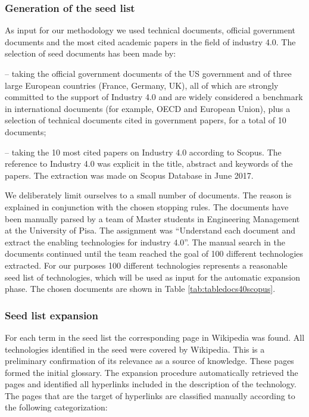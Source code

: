 \documentclass[]{book}
\theoremstyle{definition}
\theoremstyle{definition}
\theoremstyle{definition}
\theoremstyle{remark}
\begin{document}
\subsubsection*{Generation of the seed
list}\label{generation-of-the-seed-list}

As input for our methodology we used technical documents, official
government documents and the most cited academic papers in the field of
industry 4.0. The selection of seed documents has been made by:

-- taking the official government documents of the US government and of
three large European countries (France, Germany, UK), all of which are
strongly committed to the support of Industry 4.0 and are widely
considered a benchmark in international documents (for example, OECD and
European Union), plus a selection of technical documents cited in
government papers, for a total of 10 documents;

-- taking the 10 most cited papers on Industry 4.0 according to Scopus.
The reference to Industry 4.0 was explicit in the title, abstract and
keywords of the papers. The extraction was made on Scopus Database in
June 2017.

We deliberately limit ourselves to a small number of documents. The
reason is explained in conjunction with the chosen stopping rules. The
documents have been manually parsed by a team of Master students in
Engineering Management at the University of Pisa. The assignment was
``Understand each document and extract the enabling technologies for
industry 4.0''. The manual search in the documents continued until the
team reached the goal of 100 different technologies extracted. For our
purposes 100 different technologies represents a reasonable seed list of
technologies, which will be used as input for the automatic expansion
phase. The chosen documents are shown in Table
\ref{tab:tabledocs40scopus}.

\subsubsection*{Seed list expansion}\label{seed-list-expansion}

For each term in the seed list the corresponding page in Wikipedia was
found. All technologies identified in the seed were covered by
Wikipedia. This is a preliminary confirmation of its relevance as a
source of knowledge. These pages formed the initial glossary. The
expansion procedure automatically retrieved the pages and identified all
hyperlinks included in the description of the technology. The pages that
are the target of hyperlinks are classified manually according to the
following categorization:
\end{document}
